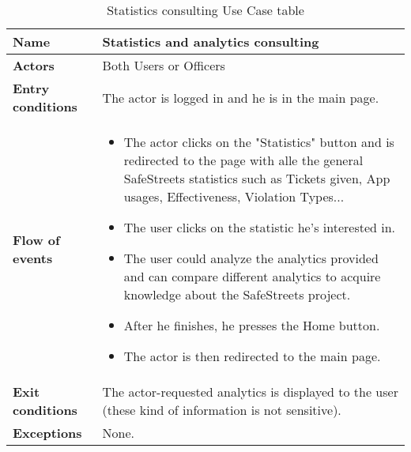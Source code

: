 \begin{table}[!htbp]
	\hypertarget{tab:statisticsconsultingtab}{}
	\centering
	\begin{tabular}{lp{9cm}}
		\bf\large Name&\bf\large Statistics and analytics consulting\\
		\hline
		\hline
		\bf Actors&Both Users or Officers\\
		\hline
		\bf Entry conditions&The actor is logged in and he is in the main page.\\
		\hline
		\bf Flow of events&
		\begin{itemize}
			
			\item The actor clicks on the "Statistics" button and is redirected to the page with alle the general SafeStreets statistics such as Tickets given, App usages, Effectiveness, Violation Types...
			
			\item The user clicks on the statistic he's interested in.
			
			\item The user could analyze the analytics provided and can compare different analytics to acquire knowledge about the SafeStreets project.
			
			\item After he finishes, he presses the Home button.
			
			\item The actor is then redirected to the main page.
			
		\end{itemize}
		\\
		\hline
		\bf Exit conditions&The actor-requested analytics is displayed to the user (these kind of information is not sensitive).\\
		\hline
		\bf Exceptions&None.
		\\
		\hline
		
	\end{tabular}
	\caption{Statistics consulting Use Case table}
	\label{tab:statisticsconsultingtab}
\end{table}
